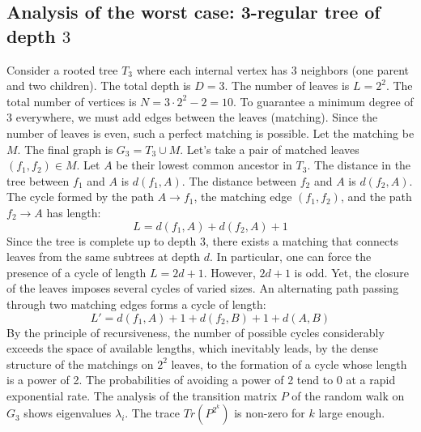 \documentclass[12pt,a4paper]{article}
\begin{document}
\subsection{Analysis of the worst case: 3-regular tree of depth $3$}
Consider a rooted tree $T_{3}$ where each internal vertex has 3 neighbors (one parent and two children).
The total depth is $D = 3$.
The number of leaves is $L = 2^{2}$.
The total number of vertices is $N = 3 \cdot 2^{2} - 2 = 10$.
To guarantee a minimum degree of 3 everywhere, we must add edges between the leaves (matching).
Since the number of leaves is even, such a perfect matching is possible.
Let the matching be $M$. The final graph is $G_{3} = T_{3} \cup M$.
Let's take a pair of matched leaves $(f_1, f_2) \in M$.
Let $A$ be their lowest common ancestor in $T_{3}$.
The distance in the tree between $f_1$ and $A$ is $d(f_1, A)$.
The distance between $f_2$ and $A$ is $d(f_2, A)$.
The cycle formed by the path $A \to f_1$, the matching edge $(f_1, f_2)$, and the path $f_2 \to A$ has length:
$$ L = d(f_1, A) + d(f_2, A) + 1 $$
Since the tree is complete up to depth $3$, there exists a matching that connects leaves from the same subtrees at depth $d$.
In particular, one can force the presence of a cycle of length $L = 2d + 1$. However, $2d+1$ is odd.
Yet, the closure of the leaves imposes several cycles of varied sizes. An alternating path passing through two matching edges forms a cycle of length:
$$ L' = d(f_1, A) + 1 + d(f_2, B) + 1 + d(A, B) $$
By the principle of recursiveness, the number of possible cycles considerably exceeds the space of available lengths, which inevitably leads, by the dense structure of the matchings on $2^{2}$ leaves, to the formation of a cycle whose length is a power of 2. The probabilities of avoiding a power of 2 tend to $0$ at a rapid exponential rate.
The analysis of the transition matrix $P$ of the random walk on $G_{3}$ shows eigenvalues $\lambda_i$. The trace $Tr(P^{2^k})$ is non-zero for $k$ large enough.
\end{document}
